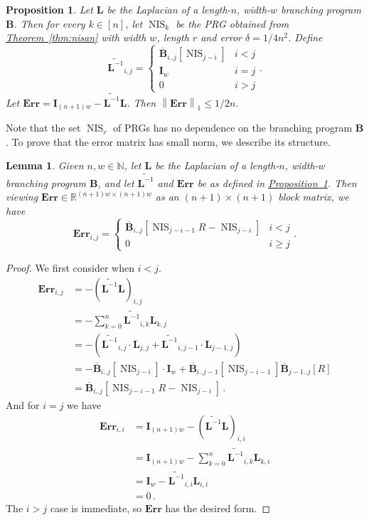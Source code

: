 \documentclass[11pt]{article}
\numberwithin{equation}{section}
\newtheorem{lemma}[theorem]{Lemma}
\newtheorem{proposition}[theorem]{Proposition}
\theoremstyle{definition}
\theoremstyle{plain}
\newcommand{\R}{\mathbb R}
\newcommand{\N}{\mathbb N}
\newcommand{\expref}[2]{\hyperref[#2]{#1~\ref{#2}}}
\newcommand{\mL}{\mathbf{L}}
\newcommand{\I}{\mathbf{I}}
\newcommand{\lbar}{\left\|}
\newcommand{\rbar}{\right\|}
\newcommand{\Lt}{\widetilde{\mathbf{L}^{-1}}}
\newcommand{\Err}{\mathbf{Err}}
\newcommand{\nis}[1][ ]{\operatorname{NIS}_{#1}}
\newcommand{\bp}{{\mathbf{B}}}
\newcommand{\bbp}{\overline{\mathbf{B}}}
\begin{document}
\begin{proposition}\label{prop:pathErrSmall}
Let $\mL$ be the Laplacian of a length-$n$, width-$w$ branching program $\bp$. Then for every $k\in[n]$, let $\nis[k]$ be the PRG obtained from \expref{Theorem}{thm:nisan} with width $w$, length $r$ and error $\delta=1/4n^2$. Define
\[\Lt_{i,j}=\begin{cases}
\bbp_{i..j}[\nis[j-i]] & i<j\\
\I_w & i=j\\
0 & i>j
\end{cases}.\] 
Let $\Err=\I_{(n+1)w}-\Lt \mL$. Then $\lbar\Err\rbar_1\leq 1/2n$. %
\end{proposition}
%
Note that the set $\nis[r]$ of PRGs has %
no dependence on the branching program $\bp$. To prove
that  %
the error matrix has small norm, we describe its structure.
\begin{lemma}\label{lem:pathErrStruct}
Given $n,w\in \N$, let $\mL$ be the Laplacian of a length-$n$, width-$w$ branching program $\bp$, and let $\Lt$ and $\Err$ be as defined in \expref{Proposition}{prop:pathErrSmall}. Then viewing $\Err\in \R^{(n+1)w\times(n+1)w}$ as an $(n+1)\times(n+1)$ block matrix, 
we have %
\[\Err_{i,j} = \begin{cases}
\bbp_{i..j}[\nis[j-i-1]R-\nis[j-i]] & i<j\\
0 & i\geq j
\end{cases}.\]
\end{lemma}
\begin{proof}
We first consider when $i<j$. %
\begin{align*}
    \Err_{i,j} &= -(\Lt \mL)_{i,j}\\
    &= -\sum_{k=0}^{n}\Lt_{i,k}\mL_{k,j}\\
    &= -\left(\Lt_{i,j}\cdot \mL_{j,j}+\Lt_{i,j-1}\cdot \mL_{j-1,j}\right)\\
    &= -\bbp_{i..j}[\nis[j-i]]\cdot \I_w+\bbp_{i..j-1}[\nis[j-i-1]]\bbp_{j-1..j}[R]\\
    &= \bbp_{i..j}[\nis[j-i-1]R-\nis[j-i]]\,.
\end{align*}
%
And for $i=j$ we have  %
\begin{align*}
    \Err_{i,i} &= \I_{(n+1)w}-(\Lt \mL)_{i,i}\\
    &= \I_{(n+1)w} - \sum_{k=0}^{n}\Lt_{i,k}\mL_{k,i}\\
    &= \I_w - \Lt_{i,i}\mL_{i,i}\\
    &= 0\,.  %
\end{align*}
The $i>j$ case is immediate, so $\Err$ has the desired form.
\end{proof}
\end{document}
